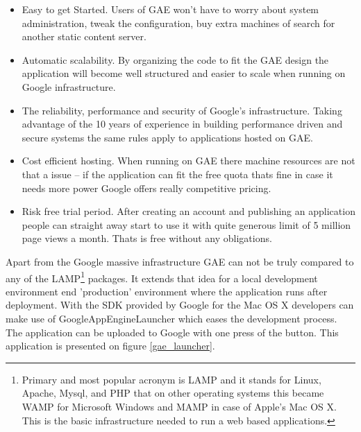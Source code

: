 \begin{itemize}
\item{Easy to get Started. Users of GAE won't have to worry about system administration, tweak the configuration, buy extra machines of search for another static content server.}
\item{Automatic scalability. By organizing the code to fit the GAE design the application will become well structured and easier to scale when running on Google infrastructure.} 
\item{The reliability, performance and security of Google's infrastructure. Taking advantage of the 10 years of experience in building performance driven and secure systems the same rules apply to applications hosted on GAE.}
\item{Cost efficient hosting. When running on GAE there machine resources are not that a issue -- if the application can fit the free quota thats fine in case it needs more power Google offers really competitive pricing.}
\item{Risk free trial period. After creating an account and publishing an application people can straight away start to use it with quite generous limit of 5 million page views a month. Thats is free without any obligations.}
\end{itemize}
Apart from the Google massive infrastructure GAE can not be truly compared to any of the LAMP\footnote{Primary and most popular acronym is LAMP and it stands for Linux, Apache, Mysql, and PHP that on other operating systems this became WAMP for Microsoft Windows and MAMP in case of Apple's Mac OS X. This is the basic infrastructure needed to run a web based applications.} packages. It extends that idea for a local development environment end 'production' environment where the application runs after deployment. With the SDK provided by Google for the Mac OS X developers can make use of GoogleAppEngineLauncher which eases the development process. The application can be uploaded to Google with one press of the button. This application is presented on figure \ref{gae_launcher}.
